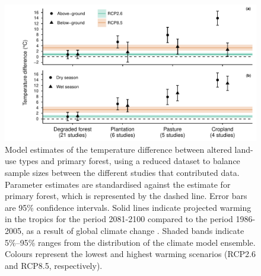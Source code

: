 \documentclass[12pt,a4paper,]{report}
\theoremstyle{definition}
\theoremstyle{definition}
\theoremstyle{definition}
\theoremstyle{remark}
\begin{document}
\begin{figure}[H]

{\centering \includegraphics{./output/fig-A-3-1} 

}

\caption{Model estimates of the temperature difference between
altered land-use types and primary forest, using a reduced dataset to
balance sample sizes between the different studies that contributed
data. Parameter estimates are standardised against the estimate for
primary forest, which is represented by the dashed line. Error bars are
95\% confidence intervals. Solid lines indicate projected warming in the
tropics for the period 2081-2100 compared to the period 1986-2005, as a
result of global climate change \citep{ipcc_climate_2013}. Shaded bands
indicate 5\%--95\% ranges from the distribution of the climate model
ensemble. Colours represent the lowest and highest warming scenarios
(RCP2.6 and RCP8.5, respectively).}\label{fig:fig-A-3}
\end{figure}
\end{document}
